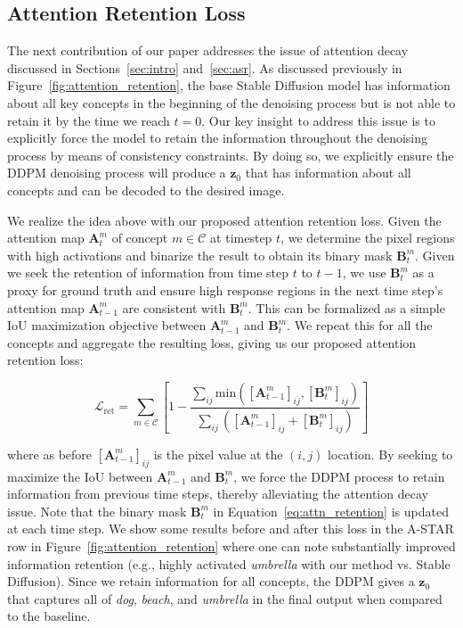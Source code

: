 \documentclass[10pt,twocolumn,letterpaper]{article}
\begin{document}
\subsection{Attention Retention Loss}

The next contribution of our paper addresses the issue of attention decay discussed in Sections~\ref{sec:intro} and~\ref{sec:asr}. As discussed previously in Figure~\ref{fig:attention_retention}, the base Stable Diffusion model has information about all key concepts in the beginning of the denoising process but is not able to retain it by the time we reach $t=0$. Our key insight to address this issue is to explicitly force the model to retain the information throughout the denoising process by means of consistency constraints. By doing so, we explicitly ensure the DDPM denoising process will produce a $\mathbf{z}_0$ that has information about all concepts and can be decoded to the desired image.

We realize the idea above with our proposed attention retention loss. Given the attention map $\mathbf{A}_t^m$ of concept $m\in \mathcal{C}$ at timestep $t$, we determine the pixel regions with high activations and binarize the result to obtain its binary mask $\mathbf{B}_{t}^m$. Given we seek the retention of information from time step $t$ to $t-1$, we use $\mathbf{B}_{t}^m$ as a proxy for ground truth and ensure high response regions in the next time step's attention map $\mathbf{A}_{t-1}^m$ are consistent with $\mathbf{B}_{t}^m$. This can be formalized as a simple IoU maximization objective between $\mathbf{A}_{t-1}^m$ and $\mathbf{B}_{t}^m$. We repeat this for all the concepts and aggregate the resulting loss, giving us our proposed attention retention loss:

\vspace{-12pt}
\begin{equation}
    \mathcal{L}_\text{ret} = \sum_{m \in \mathcal{C}} \left[ 1 -  \dfrac{\sum_{ij}\text{min}([\mathbf{A}_{t-1}^m]_{ij}, [\mathbf{B}_{t}^m]_{ij})}{\sum_{ij}([\mathbf{A}_{t-1}^m]_{ij} + [\mathbf{B}_{t}^m]_{ij})} \right]
    \label{eq:attn_retention}
\end{equation}

where as before $[\mathbf{A}_{t-1}^m]_{ij}$ is the pixel value at the $(i,j)$ location. By seeking to maximize the IoU between $\mathbf{A}_{t-1}^m$ and $\mathbf{B}_{t}^m$, we force the DDPM process to retain information from previous time steps, thereby alleviating the attention decay issue. Note that the binary mask $\mathbf{B}_{t}^m$ in Equation~\ref{eq:attn_retention} is updated at each time step. We show some results before and after this loss in the A-STAR row in Figure~\ref{fig:attention_retention} where one can note substantially improved information retention (e.g., highly activated \textit{umbrella} with our method vs. Stable Diffusion). Since we retain information for all concepts, the DDPM gives a $\mathbf{z}_0$ that captures all of \textit{dog}, \textit{beach}, and \textit{umbrella} in the final output when compared to the baseline.
\end{document}
